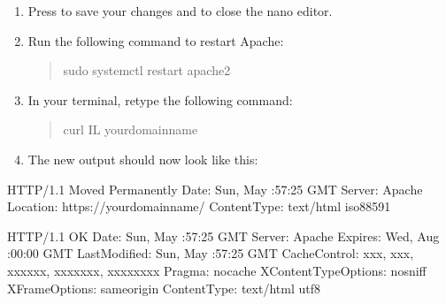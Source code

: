 \documentclass[a4paper,10pt,english,openany,oneside]{sphinxmanual}
\begin{document}
\begin{sloppypar}
\begin{enumerate}
\item {} 
\sphinxAtStartPar
Press  to save your changes and  to close the nano editor.

\item {} 
\sphinxAtStartPar
Run the following command to restart Apache:
\begin{quote}

\begin{sphinxVerbatim}[commandchars=\\\{\}]
\PYGZdl{} sudo systemctl restart apache2
\end{sphinxVerbatim}
\end{quote}

\item {} 
\sphinxAtStartPar
In your terminal, retype the following command:
\begin{quote}

\begin{sphinxVerbatim}[commandchars=\\\{\}]
\PYGZdl{} curl \PYGZhy{}IL your\PYGZhy{}domain\PYGZhy{}name
\end{sphinxVerbatim}
\end{quote}

\item {} 
\sphinxAtStartPar
The new output should now look like this:

\end{enumerate}

\begin{sphinxVerbatim}[commandchars=\\\{\},numbers=left,firstnumber=1,stepnumber=1]
HTTP/1.1  Moved Permanently
Date: Sun,  May  :57:25 GMT
Server: Apache
Location: https://your\PYGZhy{}domain\PYGZhy{}name/
Content\PYGZhy{}Type: text/html iso\PYGZhy{}8859\PYGZhy{}1

HTTP/1.1  OK
Date: Sun,  May  :57:25 GMT
Server: Apache
Expires: Wed,  Aug  :00:00 GMT
Last\PYGZhy{}Modified: Sun,  May  :57:25 GMT
Cache\PYGZhy{}Control: xxx, xxx, xxx\PYGZhy{}xxx, xxxxxxx, xxxxxxxx
Pragma: no\PYGZhy{}cache
X\PYGZhy{}Content\PYGZhy{}Type\PYGZhy{}Options: nosniff
X\PYGZhy{}Frame\PYGZhy{}Options: sameorigin
Content\PYGZhy{}Type: text/html utf\PYGZhy{}8
\end{sphinxVerbatim}


\end{sloppypar}
\end{document}
